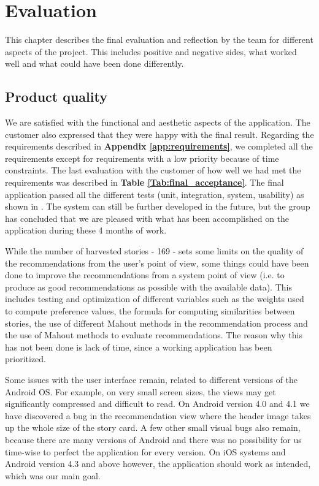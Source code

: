 
\chapter{Evaluation}

This chapter describes the final evaluation and reflection by the team for different aspects of the project. This includes positive and negative sides, what worked well and what could have been done differently.

\section{Product quality}

We are satisfied with the functional and aesthetic aspects of the application. The customer also expressed that they were happy with the final result. Regarding the requirements described in \textbf{Appendix \ref{app:requirements}}, we completed all the requirements except for requirements with a low priority because of time constraints. The last evaluation with the customer of how well we had met the requirements was described in \textbf{Table \ref{Tab:final_acceptance}}.
The final application passed all the different tests (unit, integration, system, usability) as shown in \textbf{}. The system can still be further developed in the future, but the group has concluded that we are pleased with what has been accomplished on the application during these 4 months of work.\newline

While the number of harvested stories - 169 - sets some limits on the quality of the recommendations from the user's point of view, some things could have been done to improve the recommendations from a system point of view (i.e. to produce as good recommendations as possible with the available data). This includes testing and optimization of different variables such as the weights used to compute preference values, the formula for computing similarities between stories, the use of different Mahout methods in the recommendation process and the use of Mahout methods to evaluate recommendations. The reason why this has not been done is lack of time, since a working application has been prioritized.\newline

Some issues with the user interface remain, related to different versions of the Android OS. For example, on very small screen sizes, the views may get significantly compressed and difficult to read. On Android version 4.0 and 4.1 we have discovered a bug in the recommendation view where the header image takes up the whole size of the story card. A few other small visual bugs also remain, because there are many versions of Android and there was no possibility for us time-wise to perfect the application for every version. On iOS systems and Android version 4.3 and above however, the application should work as intended, which was our main goal.

